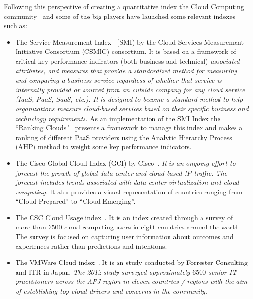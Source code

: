 Following this perspective of creating a quantitative index the Cloud Computing community~\cite{Maiya:2012:QMC:2353730.2353862,DBLP:conf/quatic/KlemsBW12} 
and some of the big players have launched some relevant indexes such as:

\begin{itemize}
 \item The Service Measurement Index~\cite{smi} (SMI) by the Cloud Services Measurement Initiative Consortium (CSMIC) consortium. It is 
 based on a framework of critical key performance indicators (both business and technical) \textit{associated attributes, and measures 
 that provide a standardized method for measuring and comparing a business service regardless of whether that service is internally provided or sourced from an outside company for any cloud service (IaaS, PaaS, SaaS, etc.). It is designed to become a 
 standard method to help organizations measure cloud-based services based on their specific business and technology requirements.} As 
 an implementation of the SMI Index the ``Ranking Clouds''~\cite{DBLP:journals/fgcs/GargVB13} presents a framework to manage this index 
 and makes a ranking of different PaaS providers using the Analytic Hierarchy Process (AHP) method to weight some key performance indicators.
 
 \item The Cisco Global Cloud Index (GCI) by Cisco~\cite{cisco}. \textit{It is an ongoing effort to forecast the growth of global data 
 center and cloud-based IP traffic. The forecast includes trends associated with data center virtualization and cloud computing. }
 It also provides a visual representation of countries ranging  from ``Cloud Prepared'' to ``Cloud Emerging''.

 \item The CSC Cloud Usage index~\cite{csc}. It is an index created through a survey of more than $3500$ cloud computing users 
 in eight countries around the world. The survey is focused on capturing user information about outcomes and 
 experiences rather than predictions and intentions.

 \item The VMWare Cloud index~\cite{vmware}. It is an study conducted by Forrester Consulting and ITR in Japan. \textit{The 2012 study surveyed 
 approximately $6500$ senior IT practitioners across the APJ region in eleven countries / regions with the aim of establishing 
 top cloud drivers and concerns in the community.}

\end{itemize}

